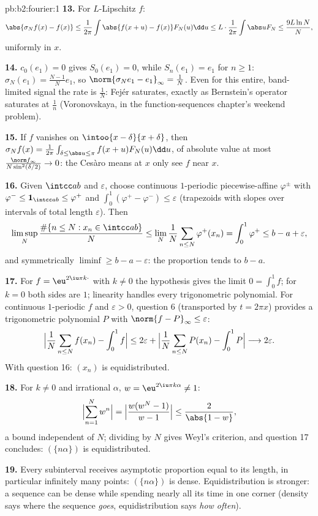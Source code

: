 \begin{solution}{pb:b2:fourier:1}
\textbf{13.} For $L$-Lipschitz $f$:
\[
\abs{\sigma_Nf(x) - f(x)}
\leq \frac{1}{2\pi}\int\abs{f(x+u) - f(x)}F_N(u)\dd u
\leq L\cdot\frac{1}{2\pi}\int\abs uF_N
\leq \frac{9L\ln N}{N},
\]
uniformly in $x$.

\textbf{14.} $c_0(e_1) = 0$ gives $S_0(e_1) = 0$, while
$S_n(e_1) = e_1$ for $n \geq 1$: $\sigma_N(e_1) =
\frac{N-1}{N}e_1$, so $\norm{\sigma_Ne_1 - e_1}_\infty =
\frac1N$. Even for this entire, band-limited signal the rate is
$\frac1N$: Fej\'er saturates, exactly as Bernstein's operator
saturates at $\frac1n$ (Voronovskaya, in the
function-sequences chapter's weekend problem).

\textbf{15.} If $f$ vanishes on $\intoo{x-\delta}{x+\delta}$,
then $\sigma_Nf(x) = \frac{1}{2\pi}\int_{\delta \leq \abs u
\leq \pi}f(x+u)F_N(u)\dd u$, of absolute value at most
$\frac{\norm f_\infty}{N\sin^2(\delta/2)} \to 0$: the Ces\`aro
means at $x$ only see $f$ near $x$.

\textbf{16.} Given $\intcc ab$ and $\varepsilon$, choose
continuous $1$-periodic piecewise-affine $\varphi^\pm$ with
$\varphi^- \leq \mathbf 1_{\intcc ab} \leq \varphi^+$ and
$\int_0^1(\varphi^+ - \varphi^-) \leq \varepsilon$ (trapezoids
with slopes over intervals of total length $\varepsilon$).
Then
\[
\limsup_N\frac{\#\{n \leq N : x_n \in \intcc ab\}}{N}
\leq \lim_N\frac1N\sum_{n\leq N}\varphi^+(x_n)
= \int_0^1\varphi^+ \leq b - a + \varepsilon ,
\]
and symmetrically $\liminf \geq b - a - \varepsilon$: the
proportion tends to $b - a$.

\textbf{17.} For $f = \eu^{2\iu\pi k\cdot}$ with $k \neq 0$ the
hypothesis gives the limit $0 = \int_0^1f$; for $k = 0$ both
sides are $1$; linearity handles every trigonometric
polynomial. For continuous $1$-periodic $f$ and $\varepsilon >
0$, question 6 (transported by $t = 2\pi x$) provides a
trigonometric polynomial $P$ with $\norm{f - P}_\infty \leq
\varepsilon$:
\[
\Bigl|\frac1N\sum_{n\leq N}f(x_n) - \int_0^1f\Bigr|
\leq 2\varepsilon +
\Bigl|\frac1N\sum_{n\leq N}P(x_n) - \int_0^1P\Bigr|
\longrightarrow 2\varepsilon .
\]
With question 16: $(x_n)$ is equidistributed.

\textbf{18.} For $k \neq 0$ and irrational $\alpha$, $w =
\eu^{2\iu\pi k\alpha} \neq 1$:
\[
\Bigl|\sum_{n=1}^{N}w^n\Bigr|
= \Bigl|\frac{w(w^N - 1)}{w - 1}\Bigr|
\leq \frac{2}{\abs{1 - w}} ,
\]
a bound independent of $N$; dividing by $N$ gives Weyl's
criterion, and question 17 concludes: $(\{n\alpha\})$ is
equidistributed.

\textbf{19.} Every subinterval receives asymptotic proportion
equal to its length, in particular infinitely many points:
$(\{n\alpha\})$ is dense. Equidistribution is stronger: a
sequence can be dense while spending nearly all its time in one
corner (density says where the sequence \emph{goes},
equidistribution says \emph{how often}).


\end{solution}
